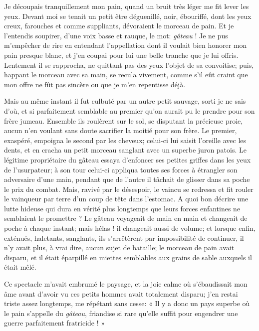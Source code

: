 Je découpais tranquillement mon pain, quand un bruit très léger me fit
lever les yeux. Devant moi se tenait un petit être déguenillé, noir,
ébouriffé, dont les yeux creux, farouches et comme suppliants,
dévoraient le morceau de pain. Et je l’entendis
soupirer, d’une voix basse et rauque, le mot: \textit{gâteau} !
Je ne pus m’empêcher de rire en entendant
l’appellation dont il voulait bien honorer mon pain
presque blanc, et j’en coupai pour lui une belle
tranche que je lui offris. Lentement il se rapprocha, ne quittant pas
des yeux l’objet de sa convoitise; puis, happant le
morceau avec sa main, se recula vivement, comme s’il
eût craint que mon offre ne fût pas sincère ou que je
m’en repentisse déjà.

Mais au même instant il fut culbuté par un autre petit sauvage, sorti je
ne sais d’où, et si parfaitement semblable au premier
qu’on aurait pu le prendre pour son frère jumeau.
Ensemble ils roulèrent sur le sol, se disputant la précieuse proie,
aucun n’en voulant sans doute sacrifier la moitié pour
son frère. Le premier, exaspéré, empoigna le second par les cheveux;
celui{}-ci lui saisit l’oreille avec les dents, et en
cracha un petit morceau sanglant avec un superbe juron patois. Le
légitime propriétaire du gâteau essaya d’enfoncer ses
petites griffes dans les yeux de l’usurpateur; à son
tour celui{}-ci appliqua toutes ses forces à étrangler son adversaire
d’une main, pendant que de l’autre il
tâchait de glisser dans sa poche le prix du combat. Mais, ravivé par le
désespoir, le vaincu se redressa et fit rouler le vainqueur par terre
d’un coup de tête dans l’estomac. A
quoi bon décrire une lutte hideuse qui dura en vérité plus longtemps
que leurs forces enfantines ne semblaient le promettre ? Le gâteau
voyageait de main en main et changeait de poche à chaque instant; mais
hélas ! il changeait aussi de volume; et lorsque enfin, exténués,
haletants, sanglants, ils s’arrêtèrent par
impossibilité de continuer, il n’y avait plus, à vrai
dire, aucun sujet de bataille; le morceau de pain avait disparu, et il
était éparpillé en miettes semblables aux grains de sable auxquels il
était mêlé.

Ce spectacle m’avait embrumé le paysage, et la joie
calme où s’ébaudissait mon âme avant
d’avoir vu ces petits hommes avait totalement disparu;
j’en restai triste assez longtemps, me répétant sans
cesse: « Il y a donc un pays superbe où le pain
s’appelle du \textit{gâteau}, friandise si rare
qu’elle suffit pour engendrer une guerre parfaitement
fratricide ! »


